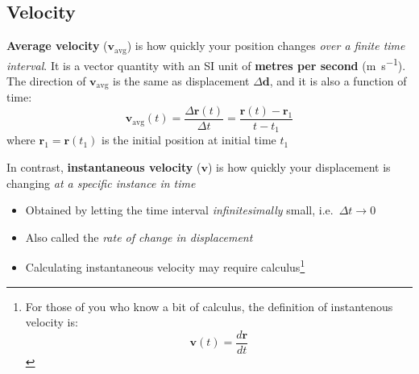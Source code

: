 



\subsection{Velocity}

\textbf{Average velocity} ($\mathbf v_\text{avg}$) is how quickly your position
changes \emph{over a finite time interval}. It is a vector quantity with an
SI unit of \textbf{metres per second} (\si{\metre\per\second}). The direction
of $\mathbf v_\text{avg}$ is the same as displacement $\Delta\mathbf d$, and it is
also a function of time:
\begin{equation}
  \boxed{
    \mathbf v_\text{avg}(t)
    =\frac{\Delta\mathbf r(t)}{\Delta t}
    =\frac{\mathbf r(t)-\mathbf r_1}{t-t_1}
  }
\end{equation}
where $\mathbf r_1=\mathbf r(t_1)$ is the initial position at initial time $t_1$

In contrast, \textbf{instantaneous velocity} ($\mathbf v$) is how quickly
your displacement is changing \emph{at a specific instance in time}
\begin{itemize}
\item Obtained by letting the time interval \emph{infinitesimally} small,
  i.e.\ $\Delta t\rightarrow 0$
\item Also called the \emph{rate of change in displacement}
\item Calculating instantaneous velocity may require calculus\footnote{For
those of you who know a bit of calculus, the definition of instantenous
velocity is:
\begin{displaymath}
  \mathbf v(t)=\frac{d\mathbf r}{dt}
\end{displaymath}}  
\end{itemize}




